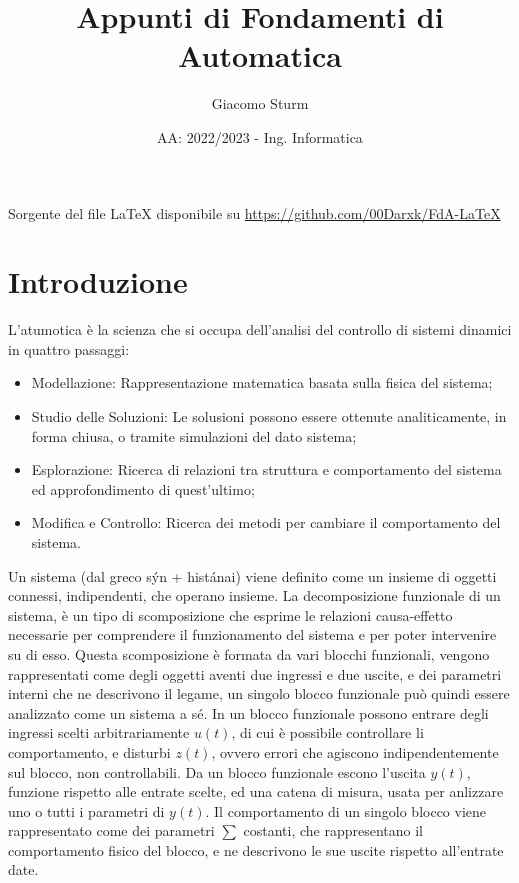 \documentclass{article}
\title{Appunti di Fondamenti di Automatica}
\author{Giacomo Sturm}
\date{AA: 2022/2023 - Ing. Informatica}
\numberwithin{equation}{subsection}
\begin{document}
\maketitle

\vspace{10mm}

\begin{center}
    Sorgente del file LaTeX disponibile su \url{https://github.com/00Darxk/FdA-LaTeX}
\end{center}

\clearpage

\tableofcontents

\clearpage

\section{Introduzione}

L'atumotica è la scienza che si occupa dell'analisi del controllo di sistemi dinamici in quattro passaggi:
\begin{itemize}
    \item Modellazione: Rappresentazione matematica basata sulla fisica del sistema;
    \item Studio delle Soluzioni: Le solusioni possono essere ottenute analiticamente, in forma chiusa, o tramite simulazioni del dato sistema;
    \item Esplorazione: Ricerca di relazioni tra struttura e comportamento del sistema ed approfondimento di quest'ultimo;
    \item Modifica e Controllo: Ricerca dei metodi per cambiare il comportamento del sistema.
\end{itemize}
Un sistema (dal greco s\'{y}n + hist\'{a}nai) viene definito come un insieme di oggetti connessi, indipendenti, che operano insieme.
La decomposizione funzionale di un sistema, è un tipo di scomposizione che esprime le relazioni causa-effetto necessarie per comprendere il 
funzionamento del sistema e per poter intervenire su di esso. 
Questa scomposizione è formata da vari blocchi funzionali, vengono rappresentati come degli oggetti aventi due ingressi e due uscite, e dei parametri 
interni che ne descrivono il legame, un singolo blocco funzionale può quindi essere analizzato come un sistema a sé. In un blocco funzionale possono 
entrare degli ingressi scelti arbitrariamente $u(t)$, di cui è possibile 
controllare li comportamento, e disturbi $z(t)$, ovvero errori che agiscono indipendentemente sul blocco, non controllabili. Da un blocco funzionale 
escono l'uscita $y(t)$, funzione rispetto alle entrate scelte, ed una catena di misura, usata per anlizzare uno o tutti i parametri di $y(t)$. 
Il comportamento di un singolo blocco viene rappresentato come dei parametri $\sum$ costanti, che rappresentano il comportamento fisico del blocco, 
e ne descrivono le sue uscite rispetto all'entrate date. 
\end{document}
